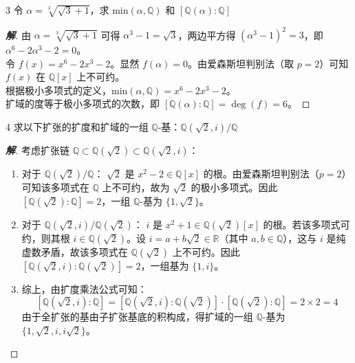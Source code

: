 \documentclass[12pt, a4paper]{article}
\newenvironment{solution}{
    \begin{proof}[\textbf{解}]
}{
    \end{proof}
}
\begin{document}
\begin{problem}{3}
    令 $\alpha=\sqrt[3]{\sqrt{3}+1}$，求 $\text{min}(\alpha, \mathbb{Q})$ 和 $[\mathbb{Q}(\alpha): \mathbb{Q}]$
\end{problem}
\begin{solution}
    由 $\alpha = \sqrt[3]{\sqrt{3}+1}$ 可得 $\alpha^3 - 1 = \sqrt{3}$，两边平方得 $(\alpha^3 - 1)^2 = 3$，即 $\alpha^6 - 2\alpha^3 - 2 = 0$。\\
    令 $f(x) = x^6 - 2x^3 - 2$。显然 $f(\alpha) = 0$。由爱森斯坦判别法（取 $p=2$）可知 $f(x)$ 在 $\mathbb{Q}[x]$ 上不可约。\\
    根据极小多项式的定义，$\text{min}(\alpha, \mathbb{Q}) = x^6 - 2x^3 - 2$。\\
    扩域的度等于极小多项式的次数，即 $[\mathbb{Q}(\alpha): \mathbb{Q}] = \deg(f) = 6$。
\end{solution}
    

\begin{problem}{4}
    求以下扩张的扩度和扩域的一组 $\mathbb{Q}$-基：$\mathbb{Q}(\sqrt{2},i) / \mathbb{Q}$
\end{problem}
\begin{solution}
    考虑扩张链 $\mathbb{Q} \subset \mathbb{Q}(\sqrt{2}) \subset \mathbb{Q}(\sqrt{2}, i)$：
    \begin{enumerate}[(1)]
        \item 对于 $\mathbb{Q}(\sqrt{2}) / \mathbb{Q}$：
        $\sqrt{2}$ 是 $x^2 - 2 \in \mathbb{Q}[x]$ 的根。由爱森斯坦判别法（$p=2$）可知该多项式在 $\mathbb{Q}$ 上不可约，故为 $\sqrt{2}$ 的极小多项式。因此 $[\mathbb{Q}(\sqrt{2}) : \mathbb{Q}] = 2$，一组 $\mathbb{Q}$-基为 $\{1, \sqrt{2}\}$。
        
        \item 对于 $\mathbb{Q}(\sqrt{2}, i) / \mathbb{Q}(\sqrt{2})$：
        $i$ 是 $x^2 + 1 \in \mathbb{Q}(\sqrt{2})[x]$ 的根。若该多项式可约，则其根 $i \in \mathbb{Q}(\sqrt{2})$。设 $i = a + b\sqrt{2} \in \mathbb{R}$（其中 $a, b \in \mathbb{Q}$），这与 $i$ 是纯虚数矛盾，故该多项式在 $\mathbb{Q}(\sqrt{2})$ 上不可约。因此 $[\mathbb{Q}(\sqrt{2}, i) : \mathbb{Q}(\sqrt{2})] = 2$，一组基为 $\{1, i\}$。
        
        \item 综上，由扩度乘法公式可知：
        $$[\mathbb{Q}(\sqrt{2}, i) : \mathbb{Q}] = [\mathbb{Q}(\sqrt{2}, i) : \mathbb{Q}(\sqrt{2})] \cdot [\mathbb{Q}(\sqrt{2}) : \mathbb{Q}] = 2 \times 2 = 4$$
        由于全扩张的基由子扩张基底的积构成，得扩域的一组 $\mathbb{Q}$-基为 $\{1, \sqrt{2}, i, i\sqrt{2}\}$。
    \end{enumerate}
\end{solution}
\end{document}
